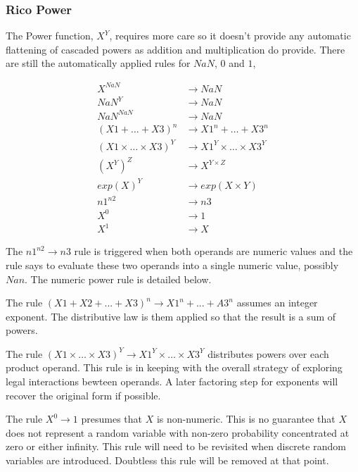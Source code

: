 \subsubsection{Rico Power}

The Power function, $X^Y$, requires more care so it doesn't provide any automatic flattening of cascaded powers as addition and multiplication do provide. There are still the automatically applied rules for $NaN$, $0$ and $1$,

\begin{align*}
X^{NaN}                        &\rightarrow NaN\\
{NaN}^Y                       &\rightarrow NaN\\
{NaN}^{NaN}                    &\rightarrow NaN\\
(X1 + \dots +X3)^n            &\rightarrow X1^n + \dots + X3^n\\
(X1 \times \dots \times X3)^Y &\rightarrow X1^Y \times \dots \times X3^Y\\
(X^Y)^Z                       &\rightarrow X^{Y \times Z}\\
exp(X)^Y                      &\rightarrow exp(X \times Y)\\
{n1}^{n2}                      &\rightarrow n3\\
X^0                           &\rightarrow 1\\
X^1                           &\rightarrow X
\end{align*}

The ${n1}^{n2} \rightarrow n3$ rule is triggered when both operands are numeric values and the rule says to evaluate these two operands into a single numeric value, possibly $Nan$. The numeric power rule is detailed below.

The rule $(X1+X2+...+X3)^n \rightarrow X1^n + ... + A3^n$ assumes an integer exponent. The distributive law is them applied so that the result is a sum of powers. 

The rule $(X1 \times \dots \times X3)^Y \rightarrow X1^Y \times \dots \times X3^Y$ distributes powers over each product operand. This rule is in keeping with the overall strategy of exploring legal interactions bewteen operands. A later factoring step for exponents will recover the original form if possible.

The rule $X^0 \rightarrow 1$ presumes that $X$ is non-numeric. This is no guarantee that $X$ does not represent a random variable with non-zero probability concentrated at zero or either infinity. This rule will need to be revisited when discrete random variables are introduced. Doubtless this rule will be removed at that point.

